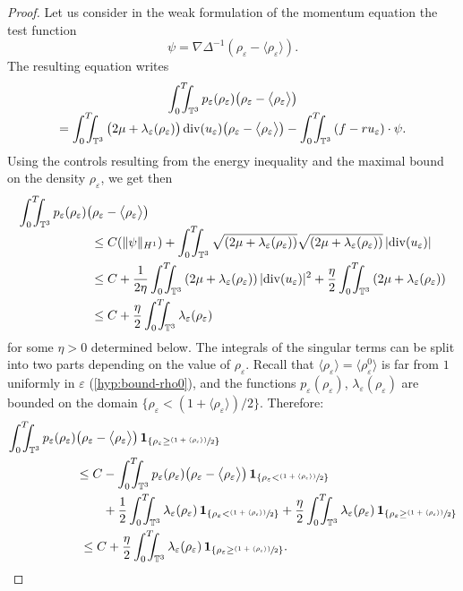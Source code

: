 \documentclass[10pt]{amsart}
\newcommand{\<}{\bigl\langle}
\renewcommand{\>}{\bigr\rangle}
\newcommand{\psfrac}[2]{\sfrac{(#1)}{#2}}
\newcommand{\intTTT}{\int_0^T\hspace*{-2.5mm}\int_{\TT}}
\theoremstyle{definition}
\theoremstyle{remark}
\newcommand{\TT}{\mathbb{T}^3}
\DeclareMathOperator{\Div}{div}
\let\ep\varepsilon
\begin{document}
\begin{proof} 
Let us consider in the weak formulation of the momentum equation the test function
\[
\psi = \nabla \Delta^{-1}(\rho_{\ep} - \<\rho_{\ep}\>).
\]
The resulting equation writes
\begin{multline*}
\intTTT{p_{\ep}(\rho_{\ep}) \big(\rho_{\ep} - \<\rho_{\ep}\>\big) } \\[-5pt]
= \intTTT{\big(2\mu+ \lambda_{\ep}(\rho_{\ep})\big)\Div(u_{\ep}) \big(\rho_{\ep} - \<\rho_{\ep}\>\big) }
- \intTTT{(f-ru_\ep) \cdot \psi}.
\end{multline*} 
Using the controls resulting from the energy inequality and the maximal bound on the density $\rho_\ep$, we get then
\begin{align*}
\intTTT p_{\ep}(\rho_{\ep}) &\big(\rho_{\ep} - \<\rho_{\ep}\>\big)\\[-5pt]
& ~ \leq C(\|\psi\|_{H^1}) + \intTTT{\sqrt{(2\mu+\lambda_{\ep}(\rho_{\ep}))} \sqrt{(2\mu+\lambda_{\ep}(\rho_{\ep}))}\,|{\Div(u_{\ep})}| } \\
& ~ \leq C + \dfrac{1}{2\eta}\intTTT{(2\mu+\lambda_{\ep}(\rho_{\ep}))\,|{\Div(u_{\ep})}|^2}
+ \dfrac{\eta}{2} \intTTT{(2\mu +\lambda_{\ep}(\rho_{\ep}))} \\
& ~ \leq C + \dfrac{\eta}{2}\intTTT{\lambda_{\ep}(\rho_{\ep})}
\end{align*}
for some $\eta>0$ determined below.
The integrals of the singular terms can be split into two parts depending on the value of $\rho_\ep$.
Recall that $\<\rho_\ep\> = \<\rho_\ep^0\>$ is far from $1$ uniformly in $\ep$ (\cf \eqref{hyp:bound-rho0}), and the functions $p_\ep(\rho_\ep)$, $\lambda_{\ep}(\rho_\ep)$ are bounded on the domain $ \{ \rho_{\ep} < {(1+\<\rho_{\ep}\>)}/{2}\}$.
Therefore:
\begin{align*}
\intTTT p_{\ep}(\rho_{\ep})& \big(\rho_{\ep} - \<\rho_{\ep}\>\big) \,\mathbf{1}_{\{ \rho_{\ep} \geq \psfrac{1+\langle\rho_{\ep}\rangle}{2} \} } \\
&\leq C - \intTTT{p_{\ep}(\rho_{\ep}) \big(\rho_{\ep} - \<\rho_{\ep}\>\big) \,\mathbf{1}_{\{ \rho_{\ep} < \psfrac{1+\langle\rho_{\ep}\rangle}{2} \} } }\\
&\hspace*{.75cm} + \dfrac{1}{2}\intTTT{\lambda_{\ep}(\rho_{\ep}) \,\mathbf{1}_{\{ \rho_{\ep} < \psfrac{1+\langle\rho_{\ep}\rangle}{2}\} } } + \dfrac{\eta}{2}\intTTT{\lambda_{\ep}(\rho_{\ep}) \,\mathbf{1}_{\{ \rho_{\ep} \geq \psfrac{1+\langle\rho_{\ep}\rangle}{2}\} } } \\
& ~ \leq C + \dfrac{\eta}{2}\intTTT{\lambda_{\ep}(\rho_{\ep}) \,\mathbf{1}_{\{ \rho_{\ep} \geq \psfrac{1+\langle\rho_{\ep}\rangle}{2}\} } }.

\end{align*}
\end{proof}
\end{document}
